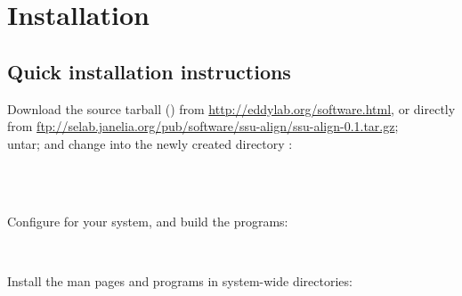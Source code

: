 
\section{Installation}
\label{sec:install}

\subsection{Quick installation instructions}
Download the source tarball () from 
\url{http://eddylab.org/software.html}, or directly from 
\url{ftp://selab.janelia.org/pub/software/ssu-align/ssu-align-0.1.tar.gz}; \\
untar; and change into the newly created directory :

\\
\\

Configure for your system, and build the programs:

\\

\begin{comment}
At this point, the programs are in the \prog{src} subdirectory, the
\prog{infernal/src} subdirectory and the
\prog{infernal/easel/miniapps} subdirectory. The
user's guide (this document) is in the \\ 
\prog{documentation/userguide}
subdirectory. The man pages are in the \prog{documentation/manpages}
subdirectory. You can manually move or copy all of these to
appropriate locations if you want. You will want the programs to be in
your \$PATH. 
\end{comment}

Install the man pages and programs in system-wide
directories:


